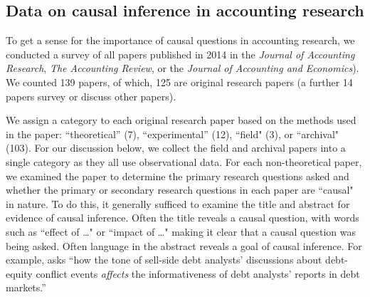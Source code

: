 \documentclass[11pt]{amsart}
\begin{document}


\subsection{Data on causal inference in accounting research}


To get a sense for the importance of causal questions in accounting research,
we conducted a survey of all papers published in 2014 in the  \textit{Journal of Accounting Research}, \textit{The Accounting Review}, or the \textit{Journal of Accounting and Economics}).
We counted 139 papers, of which, 125 are original research papers (a further 14 papers survey or discuss other papers).

We assign a category to each original research paper based on the methods used in the paper: ``theoretical''  (7), ``experimental'' (12), ``field" (3), or ``archival"  (103). 
For our discussion below, we collect the field and archival papers into a single category as they all use observational data.
For each non-theoretical paper, we examined the paper to determine the primary research questions asked and whether the primary or secondary research questions in each paper are
``causal" in nature.
To do this, it generally sufficed to examine the title and abstract for evidence of causal inference. 
Often the title reveals a causal question, with words such as  ``effect of \dots" or ``impact of \dots"  
\citep[e.g.][]{Cohen:2014jl,Clorproell:2014cv} making it clear that a causal question was being asked. 
Often language in the abstract reveals a goal of causal inference. 
For example, \citet{deFranco:2014ct} asks ``how the tone of sell-side debt analysts' discussions about debt-equity conflict events \emph{affects} the informativeness of debt analysts’ reports in debt markets.''
\end{document}
